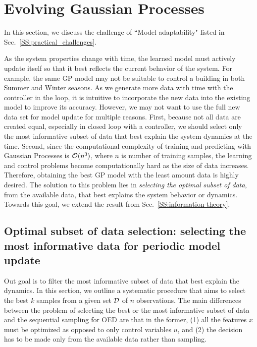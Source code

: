 \section{Evolving Gaussian Processes}
\label{S:active}

In this section, we discuss the challenge of ``Model adaptability" listed in Sec.~\ref{SS:practical_challenges}.

As the system properties change with time, the learned model must actively update itself so that it best reflects the current behavior of the system. %
For example, the same GP model may not be suitable to control a building in both Summer and Winter seasons.
As we generate more data with time with the controller in the loop, it is intuitive to incorporate the new data into the existing model to improve its accuracy.
However, we may not want to use the full new data set for model update for multiple reasons.
First, because not all data are created equal, especially in closed loop with a controller, we should select only the most informative subset of data that best explain the system dynamics at the time.
Second, since the computational complexity of training and predicting with Gaussian Processes is $\mathcal{O}(n^3)$, where $n$ is number of training samples, the learning and control problems become computationally hard as the size of data increases.
Therefore, obtaining the best GP model with the least amount data is highly desired.
The solution to this problem lies in \textit{selecting the optimal subset of data}, from the available data, that best explains the system behavior or dynamics.
Towards this goal, we extend the result from Sec.~\ref{SS:information-theory}.

\subsection{Optimal subset of data selection: selecting the most informative data for periodic model update}

Out goal is to filter the most informative subset of data that best explain the dynamics.
In this section, we outline a systematic procedure that aims to select the best $k$ samples from a given set $\mathcal{D}$ of $n$ observations.
The main differences between the problem of selecting the best or the most informative subset of data and the sequential sampling for OED are that in the former, (1) all the features \(x\) must be optimized as opposed to only control variables \(u\), and (2) the decision has to be made only from the available data rather than sampling. 

